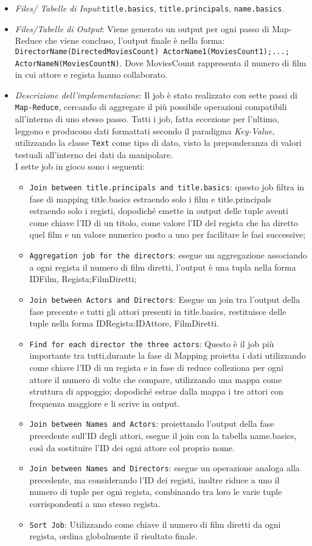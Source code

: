 \documentclass[hidelinks]{article}
\begin{document}
\begin{itemize}
	\item \textit{Files/ Tabelle di Input}:\texttt{title.basics}, \texttt{title.principals}, \texttt{name.basics}.
	\item \textit{Files/Tabelle di Output}: Viene generato un output per ogni passo di Map-Reduce che viene concluso, l'output finale è nella forma: 
	\texttt{DirectorName(DirectedMoviesCount)    ActorName1(MoviesCount1);...; ActorNameN(MoviesCountN)}.
	Dove MoviesCount rappresenta il numero di film in cui attore e regista hanno collaborato.
	\item \textit{Descrizione dell'implementazione}: Il job è stato realizzato con sette passi di \texttt{Map-Reduce}, cercando di aggregare il più possibile operazioni compatibili all'interno di uno stesso passo. Tutti i job, fatta eccezione per l'ultimo, leggono e producono dati formattati secondo il paradigma \textit{Key-Value}, utilizzando la classe \texttt{Text} come tipo di dato, visto la preponderanza di valori testuali all'interno dei dati da manipolare.\\
	I sette job in gioco sono i seguenti: 
		\begin{itemize}
		\item \texttt{Join between title.principals and title.basics}: questo job filtra in fase di mapping title.basics estraendo solo i film e title.principals estraendo solo i registi, dopodiché emette in output delle tuple aventi come chiave l'ID di un titolo, come valore l'ID del regista che ha diretto quel film e un valore numerico posto a uno per facilitare le fasi successive;
		\item \texttt{Aggregation job for the directors}: esegue un aggregazione associando a ogni regista il numero di film diretti, l'output è una tupla nella forma IDFilm, Regista;FilmDiretti;
		\item  \texttt{Join between Actors and Directors}: Esegue un join tra l'output della fase precente e tutti gli attori presenti in title.basics, restituisce delle tuple nella forma IDRegista:IDAttore, FilmDiretti.
		\item \texttt{Find for each director the three actors}: Questo è il job più importante tra tutti,durante la fase di Mapping proietta i dati utilizzando come chiave l'ID di un regista e in fase di reduce colleziona per ogni attore il numero di volte che compare, utilizzando una mappa come struttura di appoggio; dopodiché estrae dalla mappa i tre attori con frequenza maggiore e li scrive in output.
		\item  \texttt{Join between Names and Actors}: proiettando l'output della fase precedente sull'ID degli attori, esegue il join con la tabella name.basics, così da sostituire l'ID dei ogni attore col proprio nome.
		\item \texttt{Join between Names and Directors}: esegue un operazione analoga alla precedente, ma considerando l'ID dei registi, inoltre riduce a uno il numero di tuple per ogni regista, combinando tra loro le varie tuple corrispondenti a uno stesso regista.
		\item \texttt{Sort Job}: Utilizzando come chiave il numero di film diretti da ogni regista, ordina globalmente il risultato finale.
		

\end{itemize}
\end{itemize}
\end{document}
